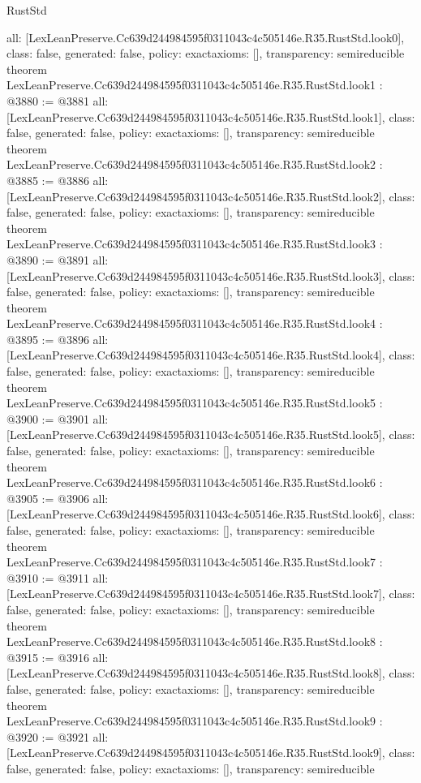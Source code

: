\begin{lexlean}{RustStd}
\begin{coremodule}
{  all: [LexLeanPreserve.Cc639d244984595f0311043c4c505146e.R35.RustStd.look0],
  class: false,
  generated: false,
  policy: exact{axioms: []},
  transparency: semireducible
}
theorem LexLeanPreserve.Cc639d244984595f0311043c4c505146e.R35.RustStd.look1 : @3880 := @3881 {
  all: [LexLeanPreserve.Cc639d244984595f0311043c4c505146e.R35.RustStd.look1],
  class: false,
  generated: false,
  policy: exact{axioms: []},
  transparency: semireducible
}
theorem LexLeanPreserve.Cc639d244984595f0311043c4c505146e.R35.RustStd.look2 : @3885 := @3886 {
  all: [LexLeanPreserve.Cc639d244984595f0311043c4c505146e.R35.RustStd.look2],
  class: false,
  generated: false,
  policy: exact{axioms: []},
  transparency: semireducible
}
theorem LexLeanPreserve.Cc639d244984595f0311043c4c505146e.R35.RustStd.look3 : @3890 := @3891 {
  all: [LexLeanPreserve.Cc639d244984595f0311043c4c505146e.R35.RustStd.look3],
  class: false,
  generated: false,
  policy: exact{axioms: []},
  transparency: semireducible
}
theorem LexLeanPreserve.Cc639d244984595f0311043c4c505146e.R35.RustStd.look4 : @3895 := @3896 {
  all: [LexLeanPreserve.Cc639d244984595f0311043c4c505146e.R35.RustStd.look4],
  class: false,
  generated: false,
  policy: exact{axioms: []},
  transparency: semireducible
}
theorem LexLeanPreserve.Cc639d244984595f0311043c4c505146e.R35.RustStd.look5 : @3900 := @3901 {
  all: [LexLeanPreserve.Cc639d244984595f0311043c4c505146e.R35.RustStd.look5],
  class: false,
  generated: false,
  policy: exact{axioms: []},
  transparency: semireducible
}
theorem LexLeanPreserve.Cc639d244984595f0311043c4c505146e.R35.RustStd.look6 : @3905 := @3906 {
  all: [LexLeanPreserve.Cc639d244984595f0311043c4c505146e.R35.RustStd.look6],
  class: false,
  generated: false,
  policy: exact{axioms: []},
  transparency: semireducible
}
theorem LexLeanPreserve.Cc639d244984595f0311043c4c505146e.R35.RustStd.look7 : @3910 := @3911 {
  all: [LexLeanPreserve.Cc639d244984595f0311043c4c505146e.R35.RustStd.look7],
  class: false,
  generated: false,
  policy: exact{axioms: []},
  transparency: semireducible
}
theorem LexLeanPreserve.Cc639d244984595f0311043c4c505146e.R35.RustStd.look8 : @3915 := @3916 {
  all: [LexLeanPreserve.Cc639d244984595f0311043c4c505146e.R35.RustStd.look8],
  class: false,
  generated: false,
  policy: exact{axioms: []},
  transparency: semireducible
}
theorem LexLeanPreserve.Cc639d244984595f0311043c4c505146e.R35.RustStd.look9 : @3920 := @3921 {
  all: [LexLeanPreserve.Cc639d244984595f0311043c4c505146e.R35.RustStd.look9],
  class: false,
  generated: false,
  policy: exact{axioms: []},
  transparency: semireducible
}
\end{coremodule}
\end{lexlean}

